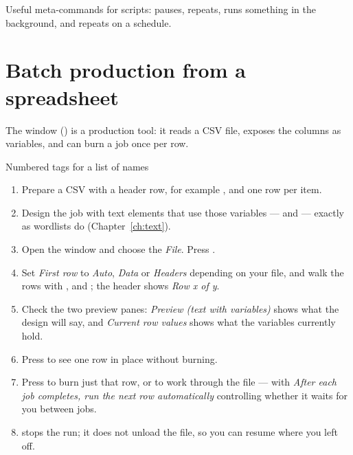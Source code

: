 \noindent Useful meta-commands for scripts:  pauses,
 repeats,  runs something
in the background, and  repeats on a
schedule.

\section{Batch production from a spreadsheet}

The  window () is a
production tool: it reads a CSV file, exposes the columns as variables, and can
burn a job once per row.

\begin{walkthrough}{Numbered tags for a list of names}
\begin{enumerate}[label=\arabic*.,leftmargin=1.4em]
  \item Prepare a CSV with a header row, for example , and one
        row per item.
  \item Design the job with text elements that use those variables ---
         and  --- exactly as wordlists do
        (Chapter~\ref{ch:text}).
  \item Open the window and choose the \emph{File}. Press .
  \item Set \emph{First row} to \emph{Auto}, \emph{Data} or \emph{Headers}
        depending on your file, and walk the rows with ,  and
        ; the header shows \emph{Row x of y}.
  \item Check the two preview panes: \emph{Preview (text with {variables})} shows
        what the design will say, and \emph{Current row values} shows what the
        variables currently hold.
  \item Press  to see one row in place without burning.
  \item Press  to burn just that row, or 
        to work through the file --- with
        \emph{After each job completes, run the next row automatically} controlling
        whether it waits for you between jobs.
  \item {} stops the run; it does not unload the file, so you can
        resume where you left off.
\end{enumerate}
\end{walkthrough}


